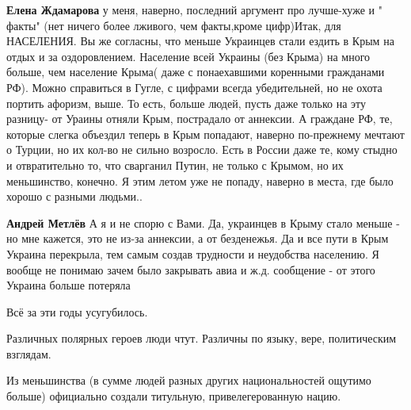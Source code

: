 \begin{itemize}
\begin{itemize}
 
\textbf{Елена Ждамарова} у меня, наверно, последний аргумент про лучше-хуже и "
факты" (нет ничего более лживого, чем факты,кроме цифр)Итак, для НАСЕЛЕНИЯ. Вы
же согласны, что меньше Украинцев стали ездить в Крым на отдых и за
оздоровлением. Население всей Украины (без Крыма) на много больше, чем
население Крыма( даже с понаехавшими коренными гражданами РФ). Можно справиться
в Гугле, с цифрами всегда убедительней, но не охота портить афоризм, выше. То
есть, больше людей, пусть даже только на эту разницу- от Ураины отняли Крым,
пострадало от аннексии. А граждане РФ, те, которые слегка объездил теперь в
Крым попадают, наверно по-прежнему мечтают о Турции, но их кол-во не сильно
возросло. Есть в России даже те, кому стыдно и отвратительно то, что сварганил
Путин, не только с Крымом, но их меньшинство, конечно. Я этим летом уже не
попаду, наверно в места, где было хорошо с разными людьми..

 
\textbf{Андрей Метлёв} А я и не спорю с Вами. Да, украинцев в Крыму стало
меньше - но мне кажется, это не из-за аннексии, а от безденежья. Да и все пути
в Крым Украина перекрыла, тем самым создав трудности и неудобства населению. Я
вообще не понимаю зачем было закрывать авиа и ж.д. сообщение - от этого Украина
больше потеряла

\end{itemize}

 
Всё за эти годы усугубилось.

Различных полярных героев люди чтут. Различны по языку, вере, политическим
взглядам.

Из меньшинства (в сумме людей разных других национальностей ощутимо больше)
официально создали титульную, привелегерованную нацию.


\end{itemize}
